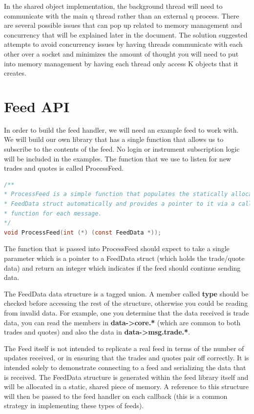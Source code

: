 In the shared object implementation, the background thread will need to communicate
with the main q thread rather than an external q process. There are several possible
issues that can pop up related to memory management and concurrency that will be
explained later in the document. The solution suggested attempts to avoid concurrency
issues by having threads communicate with each other over a socket and minimizes the
amount of thought you will need to put into memory management by having each thread
only access K objects that it creates.

\section{Feed API}

In order to build the feed handler, we will need an example feed to work with.
We will build our own library that has a single function that allows us to
subscribe to the contents of the feed. No login or instrument subscription
logic will be included in the examples. The function that we use to listen for
new trades and quotes is called ProcessFeed.

\begin{lstlisting}[language=C]
/**
* ProcessFeed is a simple function that populates the statically allocated
* FeedData struct automatically and provides a pointer to it via a callback
* function for each message.
*/
void ProcessFeed(int (*) (const FeedData *));
\end{lstlisting}

The function that is passed into ProcessFeed should expect to take a single parameter which is a pointer to a FeedData struct (which holds the trade/quote data) and return an integer which indicates if the feed should continue sending data.

The FeedData data structure is a tagged union. A member called \textbf{type} should be checked before accessing the rest of the structure, otherwise you could be reading from invalid data. For example, one you determine that the data received is trade data, you can read the members in \textbf{data->core.*} (which are common to both trades and quotes) and also the data in \textbf{data->msg.trade.*}.

The Feed itself is not intended to replicate a real feed in terms of the number of updates received, or in ensuring that the trades and quotes pair off correctly. It is intended solely to demonstrate connecting to a feed and serializing the data that
is received.  The FeedData structure is generated within the feed library itself and will be allocated in a static, shared piece of memory. A reference to this structure will then be passed to the feed handler on each callback (this is a common strategy in implementing these types of feeds).

